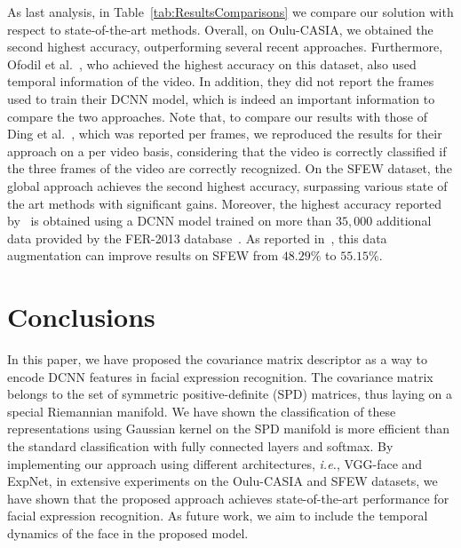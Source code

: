 \documentclass{bmvc2k}
\begin{document}
As last analysis, in Table~\ref{tab:ResultsComparisons} we compare our solution with respect to state-of-the-art methods.
Overall, on Oulu-CASIA, we obtained the second highest accuracy, outperforming several recent approaches. Furthermore, Ofodil et al.~\cite{ofodile2017automatic}, who achieved the highest accuracy on this dataset, also used temporal information of the video. In addition, they did not report the frames used to train their DCNN model, which is indeed an important information to compare the two approaches. Note that, to compare our results with those of Ding et al.~\cite{ding2017facenet2expnet}, which was reported per frames, we reproduced the results for their approach on a per video basis, considering that the video is correctly classified if the three frames of the video are correctly recognized.
On the SFEW dataset, the global approach achieves the second highest accuracy, surpassing various state of the art methods with significant gains. Moreover, the highest accuracy reported by~\cite{yu2015image} is obtained using a DCNN model trained on more than $35,000$ additional data provided by the FER-2013 database~\cite{goodfellow2013challenges}. As reported in~\cite{ding2017facenet2expnet}, this data augmentation can improve results on SFEW from $48.29\%$ to $55.15\%$. 
\section{Conclusions}\label{sect:conclusion}
In this paper, we have proposed the covariance matrix descriptor as a way to encode DCNN features in facial expression recognition. 
The covariance matrix belongs to the set of symmetric positive-definite (SPD) matrices, thus laying on a special Riemannian manifold. We have shown the classification of these representations using Gaussian kernel on the SPD manifold is more efficient than the standard classification with fully connected layers and softmax. By implementing our approach using different architectures, \emph{i.e.}, VGG-face and ExpNet, in extensive experiments on the Oulu-CASIA and SFEW datasets, we have shown that the proposed approach achieves state-of-the-art performance for facial expression recognition. As future work, we aim to include the temporal dynamics of the face in the proposed model. 



%
%
%
%
%

%
\end{document}
